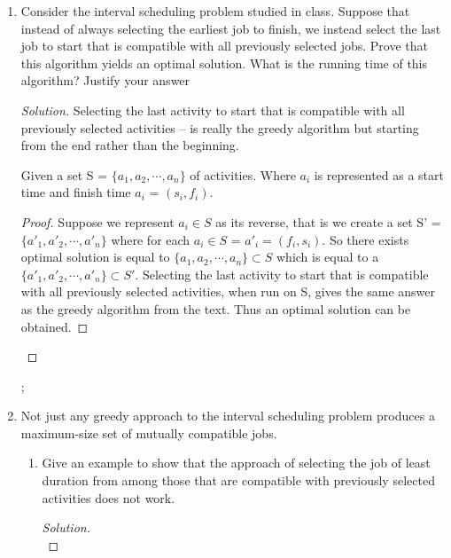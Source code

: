 \documentclass[12pt]{article}
\begin{document}
\maketitle
{}
         
         \begin{enumerate}
         \item
         Consider the interval scheduling problem studied in class. Suppose that instead of always
selecting the earliest job to finish, we instead select the last job to start that is compatible
with all previously selected jobs. Prove that this algorithm yields an optimal solution.
What is the running time of this algorithm? Justify your answer


	\begin{proof}[Solution]
		Selecting the last activity to start that is compatible
with all previously selected activities – is really the greedy algorithm but starting
from the end rather than the beginning.

Given a set S = $\{a_1, a_2, \cdots, a_n\}$ of activities. Where $a_i$ is represented as a start time and finish time $a_i$ = $ (s_i, f_i)$. 

\begin{proof} Suppose we represent $a_i \in S$ as its reverse, that is we create a set S' = $\{a'_1, a'_2, \cdots, a'_n\}$ where for each $a_i \in S$ = $a'_i =  (f_i, s_i)$. So there exists optimal solution is equal to $\{a_1, a_2, \cdots, a_n\} \subset S$ which is equal to a $\{a'_1, a'_2, \cdots, a'_n\}\subset S'$. Selecting the last activity to start that is compatible with all previously selected activities, when run on S, gives the same answer as the greedy algorithm from the text. Thus an optimal solution can be obtained.

\end{proof}
		
	\end{proof}
	\break;
	\item
	Not just any greedy approach to the interval scheduling problem produces a maximum-size
set of mutually compatible jobs.
\begin{enumerate}
	\item
	Give an example to show that the approach of selecting the job of least duration from
among those that are compatible with previously selected activities does not work.
	\begin{proof}[Solution]\;\\


\end{proof}
\end{enumerate}
\end{enumerate}
\end{document}
